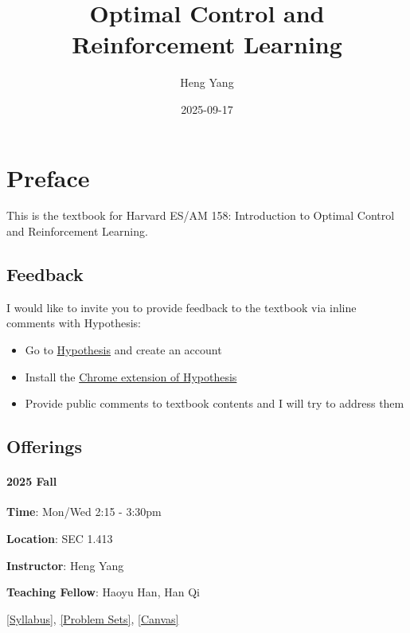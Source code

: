 \documentclass[
]{book}
\title{Optimal Control and Reinforcement Learning}
\author{Heng Yang}
\date{2025-09-17}
\theoremstyle{definition}
\theoremstyle{definition}
\theoremstyle{definition}
\theoremstyle{definition}
\theoremstyle{remark}
\begin{document}
\maketitle

{
\setcounter{tocdepth}{1}
\tableofcontents
}
\chapter*{Preface}\label{preface}

This is the textbook for Harvard ES/AM 158: Introduction to Optimal Control and Reinforcement Learning.

\section*{Feedback}\label{feedback}

I would like to invite you to provide feedback to the textbook via inline comments with Hypothesis:

\begin{itemize}
\item
  Go to \href{https://hypothes.is}{Hypothesis} and create an account
\item
  Install the \href{https://chrome.google.com/webstore/detail/hypothesis-web-pdf-annota/bjfhmglciegochdpefhhlphglcehbmek}{Chrome extension of Hypothesis}
\item
  Provide public comments to textbook contents and I will try to address them
\end{itemize}

\section*{Offerings}\label{offerings}

\subsubsection*{2025 Fall}\label{fall}

\textbf{Time}: Mon/Wed 2:15 - 3:30pm

\textbf{Location}: SEC 1.413

\textbf{Instructor}: Heng Yang

\textbf{Teaching Fellow}: Haoyu Han, Han Qi

\href{https://docs.google.com/document/d/1dIRYQZZJDx8K2q1TrodDDLg-bKJWWmj7o7yzOGlIs7o/edit?usp=sharing}{{[}Syllabus{]}}, \href{https://github.com/ComputationalRobotics/2025-ES-AM-158-PSET}{{[}Problem Sets{]}}, \href{https://canvas.harvard.edu/courses/153422}{{[}Canvas{]}}
\end{document}
